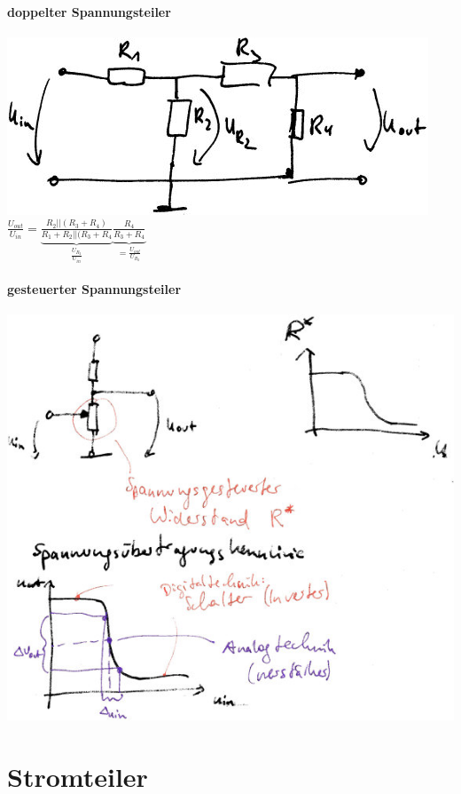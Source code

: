 \paragraph{doppelter Spannungsteiler} \parskp
\includegraphics[scale=1.5]{Abbildungen/ABB212}\\
$\frac{U_{out}}{U_{in}}=\underbrace{\frac{R_2|| (R_3+R_4)}{R_1+R_2||(R_3+R_4}}_{\frac{U_{R_2}}{U_{in}}} \underbrace{\frac{R_4}{R_3+R_4}}_{=\frac{U_{out}}{U_{R_2}}}$

\paragraph{gesteuerter Spannungsteiler}\parskp
\includegraphics[scale=1.5]{Abbildungen/ABB301}

\section{Stromteiler}

